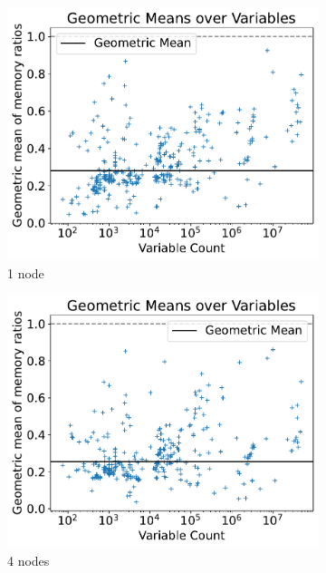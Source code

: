 \documentclass[12pt,a4paper,twoside]{scrartcl}
\numberwithin{equation}{section}
\begin{document}
\begin{figure}[!h]
  \center
  \begin{subfigure}[c]{.45\textwidth}
    \center
    \includegraphics[scale=.45]{plots/1node_compare/mem_gm_over_vars.pdf}
    \caption{1 node}
  \end{subfigure}
  \begin{subfigure}[c]{.45\textwidth}
    \center
    \includegraphics[scale=.45]{plots/4node_compare/mem_gm_over_vars.pdf}
    \caption{4 nodes}
  \end{subfigure}
  \begin{subfigure}[c]{.45\textwidth}

\end{subfigure}
\end{figure}
\end{document}

